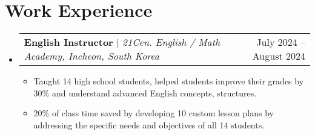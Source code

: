 \documentclass[letterpaper,11pt]{article}
\makeatletter
\newcommand{\resumeItem}[1]{
  \item\small{
    {#1 \vspace{-3pt}}
  }
}
\newcommand{\resumeSubheading}[4]{
  \vspace{-2pt}\item
    \begin{tabular*}{0.97\textwidth}[t]{l@{\extracolsep{\fill}}r@{\hspace{-0.2in}}}
        \textbf{#1} & #2 \\
        \textit{\small#3} & \textit{\small #4} \\
    \end{tabular*}\vspace{-7pt}
}
\newcommand{\resumeProjectHeading}[2]{
    \item
    \begin{tabular*}{0.97\textwidth}{l@{\extracolsep{\fill}}r@{\hspace{-0.2in}}}
        \small#1 & #2 \\
    \end{tabular*}\vspace{-7pt}
}
\newcommand{\resumeSubHeadingListStart}{\begin{itemize}[leftmargin=0.00in, rightmargin=-0.2in, label={}]}
\newcommand{\resumeSubHeadingListEnd}{\end{itemize}}
\newcommand{\resumeItemListStart}{\begin{itemize}[leftmargin=0.15in, rightmargin=0.15in]}
\newcommand{\resumeItemListEnd}{\end{itemize}\vspace{-7pt}}
\makeatother
\begin{document}




\section{Work Experience}
    \vspace{-3pt}

    \resumeSubHeadingListStart
        \resumeProjectHeading
            {\textbf{English Instructor} $|$ \emph{21Cen. English / Math Academy, Incheon, South Korea}}{July 2024 -- August 2024}
            \resumeItemListStart
                \resumeItem{Taught 14 high school students, helped students improve their grades by 30\% and understand advanced English concepts, structures.}
                \resumeItem{20\% of class time saved by developing 10 custom lesson plans by addressing the specific needs and objectives of all 14 students.}
            \resumeItemListEnd
        \resumeSubHeadingListEnd
\end{document}
